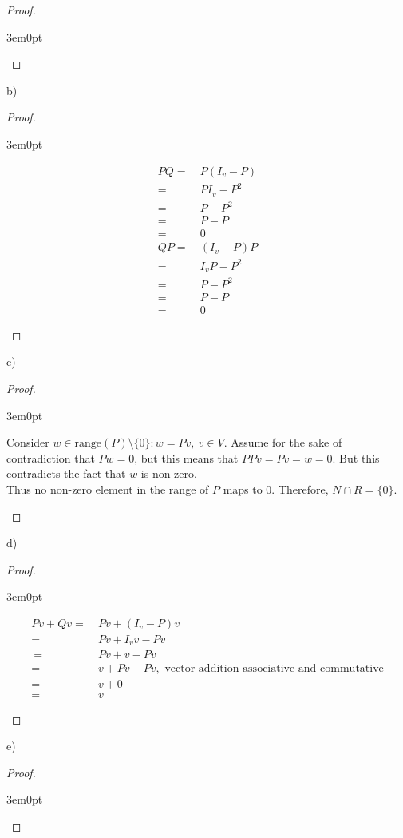 \documentclass[11pt]{article}
\newenvironment{myproof}
{\begin{proof} \begin{adjustwidth}{3em}{0pt}$ $\par\nobreak\ignorespaces}
{\end{adjustwidth} \end{proof}}
\begin{document}
\begin{flushleft}
\begin{myproof}
\end{myproof}

b)

\begin{myproof}

\begin{align*}
PQ =& \ P(I_v - P) \\
= & \ PI_v - P^2 \\
= & \ P - P^2 \\
= & \ P - P \\
= & \ 0 \\
QP = & \ (I_v - P)P \\
= & \ I_vP - P^2 \\
= & \ P - P^2 \\
= & \ P - P \\
= & \ 0
\end{align*}

\end{myproof}

c)

\begin{myproof}

Consider $w \in \text{range}(P) \setminus \{ 0\}: w = Pv, \ v \in V$. Assume for the sake of contradiction that $Pw = 0$, but this means that $PPv = Pv = w = 0$. But this contradicts the fact that $w$ is non-zero. \\
\bigskip
Thus no non-zero element in the range of $P$ maps to 0. Therefore, $N \cap R = \{ 0\}$.

\end{myproof}

d)

\begin{myproof}

\begin{align*}
Pv + Qv = & \ Pv + (I_v - P)v \\
= & \ Pv + I_vv - Pv \\\
= & \ Pv + v - Pv \\
= & \ v + Pv - Pv, \text{ vector addition associative and commutative} \\
= & \ v + 0 \\
= & \ v
\end{align*}

\end{myproof}

e)

\begin{myproof}


\end{myproof}
\end{flushleft}
\end{document}
